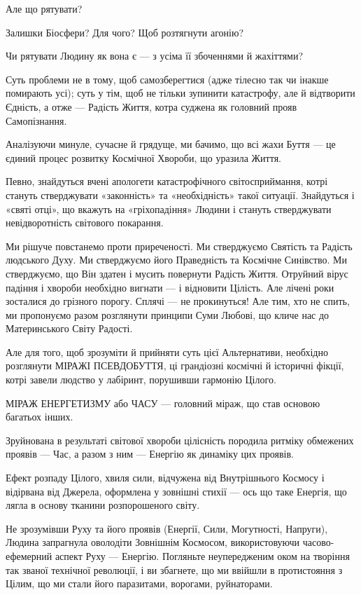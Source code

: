 Але що рятувати?

Залишки Біосфери? Для чого? Щоб розтягнути агонію?

Чи рятувати Людину як вона є — з усіма її збоченнями й жахіттями?

Суть проблеми не в тому, щоб самозберегтися (адже тілесно так чи інакше
помирають усі); суть у тім, щоб не тільки зупинити катастрофу, але й відтворити
Єдність, а отже — Радість Життя, котра суджена як головний прояв Самопізнання.

Аналізуючи минуле, сучасне й грядуще, ми бачимо, що всі жахи Буття — це єдиний
процес розвитку Космічної Хвороби, що уразила Життя.

Певно, знайдуться вчені апологети катастрофічного світосприймання, котрі
стануть стверджувати «законність» та «необхідність» такої ситуації. Знайдуться
і «святі отці», що вкажуть на «гріхопадіння» Людини і стануть стверджувати
невідворотність світового покарання.

Ми рішуче повстанемо проти приреченості. Ми стверджуємо Святість та Радість
людського Духу. Ми стверджуємо його Праведність та Космічне Синівство. Ми
стверджуємо, що Він здатен і мусить повернути Радість Життя. Отруйний вірус
падіння і хвороби необхідно вигнати — і відновити Цілість. Але лічені роки
зосталися до грізного порогу. Сплячі — не прокинуться! Але тим, хто не спить,
ми пропонуємо разом розглянути принципи Суми Любові, що кличе нас до
Материнського Світу Радості.

Але для того, щоб зрозуміти й прийняти суть цієї Альтернативи, необхідно
розглянути МІРАЖІ ПСЕВДОБУТТЯ, ці грандіозні космічні й історичні фікції, котрі
завели людство у лабіринт, порушивши гармонію Цілого.

МІРАЖ ЕНЕРГЕТИЗМУ або ЧАСУ — головний міраж, що став основою багатьох інших.

Зруйнована в результаті світової хвороби цілісність породила ритміку обмежених
проявів — Час, а разом з ним — Енергію як динаміку цих проявів.

Ефект розпаду Цілого, хвиля сили, відчужена від Внутрішнього Космосу і
відірвана від Джерела, оформлена у зовнішні стихії — ось що таке Енергія, що
лягла в основу тканини розпорошеного світу.

Не зрозумівши Руху та його проявів (Енергії, Сили, Могутності, Напруги), Людина
запрагнула оволодіти Зовнішнім Космосом, використовуючи часово-ефемерний аспект
Руху — Енергію. Погляньте неупередженим оком на творіння так званої технічної
революції, і ви збагнете, що ми ввійшли в протистояння з Цілим, що ми стали
його паразитами, ворогами, руйнаторами.

